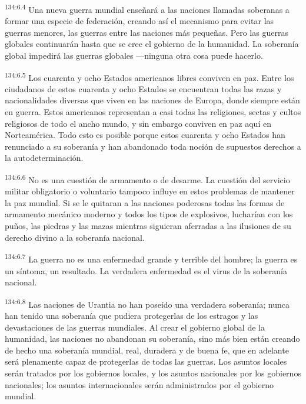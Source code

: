 \par
\textsuperscript{134:6.4} Una nueva guerra mundial enseñará a las naciones llamadas soberanas a formar una especie de federación, creando así el mecanismo para evitar las guerras menores, las guerras entre las naciones más pequeñas. Pero las guerras globales continuarán hasta que se cree el gobierno de la humanidad. La soberanía global impedirá las guerras globales ---ninguna otra cosa puede hacerlo.

\par
\textsuperscript{134:6.5} Los cuarenta y ocho Estados americanos libres conviven en paz. Entre los ciudadanos de estos cuarenta y ocho Estados se encuentran todas las razas y nacionalidades diversas que viven en las naciones de Europa, donde siempre están en guerra. Estos americanos representan a casi todas las religiones, sectas y cultos religiosos de todo el ancho mundo, y sin embargo conviven en paz aquí en Norteamérica. Todo esto es posible porque estos cuarenta y ocho Estados han renunciado a su soberanía y han abandonado toda noción de supuestos derechos a la autodeterminación.

\par
\textsuperscript{134:6.6} No es una cuestión de armamento o de desarme. La cuestión del servicio militar obligatorio o voluntario tampoco influye en estos problemas de mantener la paz mundial. Si se le quitaran a las naciones poderosas todas las formas de armamento mecánico moderno y todos los tipos de explosivos, lucharían con los puños, las piedras y las mazas mientras siguieran aferradas a las ilusiones de su derecho divino a la soberanía nacional.

\par
\textsuperscript{134:6.7} La guerra no es una enfermedad grande y terrible del hombre; la guerra es un síntoma, un resultado. La verdadera enfermedad es el virus de la soberanía nacional.

\par
\textsuperscript{134:6.8} Las naciones de Urantia no han poseído una verdadera soberanía; nunca han tenido una soberanía que pudiera protegerlas de los estragos y las devastaciones de las guerras mundiales. Al crear el gobierno global de la humanidad, las naciones no abandonan su soberanía, sino más bien están creando de hecho una soberanía mundial, real, duradera y de buena fe, que en adelante será plenamente capaz de protegerlas de todas las guerras. Los asuntos locales serán tratados por los gobiernos locales, y los asuntos nacionales por los gobiernos nacionales; los asuntos internacionales serán administrados por el gobierno mundial.

